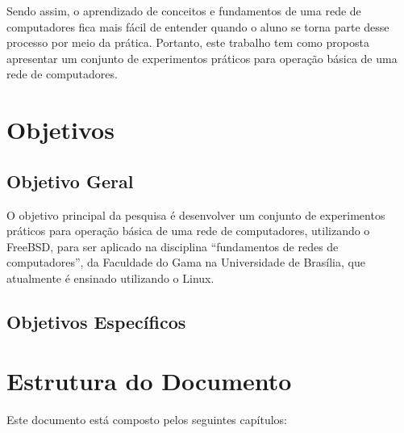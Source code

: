 Sendo assim, o aprendizado de conceitos e fundamentos de uma rede de computadores fica mais fácil de entender quando o aluno se torna parte desse processo por meio da prática. Portanto, este trabalho tem como proposta apresentar um conjunto de experimentos práticos para operação básica de uma rede de computadores.


\section{Objetivos}

    \subsection{Objetivo Geral}
    
    O objetivo principal da pesquisa é desenvolver um conjunto de experimentos práticos para operação básica de uma rede de computadores, utilizando o FreeBSD, para ser aplicado na disciplina “fundamentos de redes de computadores”, da Faculdade do Gama na Universidade de Brasília, que atualmente é ensinado utilizando o Linux.
    
    \subsection{Objetivos Específicos}
    
    
    
\section{Estrutura do Documento}

Este documento está composto pelos seguintes capítulos:

